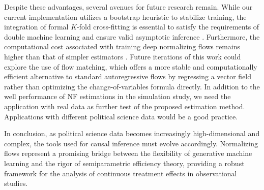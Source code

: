 \documentclass[12pt]{article}
\theoremstyle{definition}
\begin{document}
Despite these advantages, several avenues for future research remain. While our current implementation utilizes a bootstrap heuristic to stabilize training, the integration of formal $K$-fold cross-fitting is essential to satisfy the requirements of double machine learning and ensure valid asymptotic inference \citep{chernozhukov2018double}. Furthermore, the computational cost associated with training deep normalizing flows remains higher than that of simpler estimators \citep{Papamakarios2021a}. Future iterations of this work could explore the use of flow matching, which offers a more stable and computationally efficient alternative to standard autoregressive flows by regressing a vector field rather than optimizing the change-of-variables formula directly. In addition to the well performance of NF estimations in the simulation study, we need the application with real data as further test of the proposed estimation method. Applications with different political science data would be a good practice.

In conclusion, as political science data becomes increasingly high-dimensional and complex, the tools used for causal inference must evolve accordingly. Normalizing flows represent a promising bridge between the flexibility of generative machine learning and the rigor of semiparametric efficiency theory, providing a robust framework for the analysis of continuous treatment effects in observational studies.



\clearpage


\end{document}
